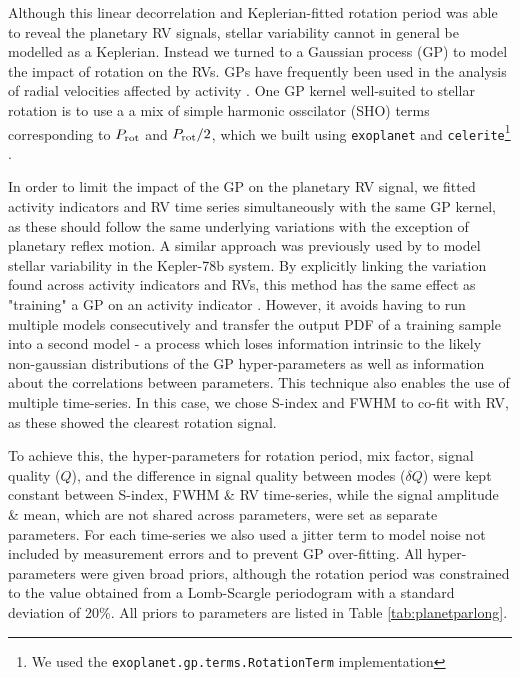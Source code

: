 \documentclass[fleqn,usenatbib]{mnras}
\begin{document}
Although this linear decorrelation and Keplerian-fitted rotation period was able to reveal the planetary RV signals, stellar variability cannot in general be modelled as a Keplerian.
Instead we turned to a Gaussian process (GP) to model the impact of rotation on the RVs.
GPs have frequently been used in the analysis of radial velocities affected by activity \citep[e.g.][]{2014MNRAS.443.2517H,2019A&A...627A..43D}.
One GP kernel well-suited to stellar rotation is to use a a mix of simple harmonic osscilator (SHO) terms corresponding to $P_{\rm rot}$ and $P_{\rm rot}/2$, which we built using \texttt{exoplanet} and \texttt{celerite}\footnote{We used the \texttt{exoplanet.gp.terms.RotationTerm} implementation} \citep{exoplanet:foremanmackey17}.

In order to limit the impact of the GP on the planetary RV signal, we fitted activity indicators and RV time series simultaneously with the same GP kernel, as these should follow the same underlying variations with the exception of planetary reflex motion.
A similar approach was previously used by \citet{grunblatt2015determining} to model stellar variability in the Kepler-78b system.
By explicitly linking the variation found across activity indicators and RVs, this method has the same effect as "training" a GP on an activity indicator \citep[e.g.][]{2019A&A...627A..43D}.
However, it avoids having to run multiple models consecutively and transfer the output PDF of a training sample into a second model - a process which loses information intrinsic to the likely non-gaussian distributions of the GP hyper-parameters as well as information about the correlations between parameters.
This technique also enables the use of multiple time-series.
In this case, we chose S-index and FWHM to co-fit with RV, as these showed the clearest rotation signal.

To achieve this, the hyper-parameters for rotation period, mix factor, signal quality ($Q$), and the difference in signal quality between modes ($\delta Q$) were kept constant between S-index, FWHM \& RV time-series, while the signal amplitude \& mean, which are not shared across parameters, were set as separate parameters.
For each time-series we also used a jitter term to model noise not included by measurement errors and to prevent GP over-fitting.
All hyper-parameters were given broad priors, although the rotation period was constrained to the value obtained from a Lomb-Scargle periodogram with a standard deviation of 20\%.
All priors to parameters are listed in Table \ref{tab:planetparlong}.
\end{document}
